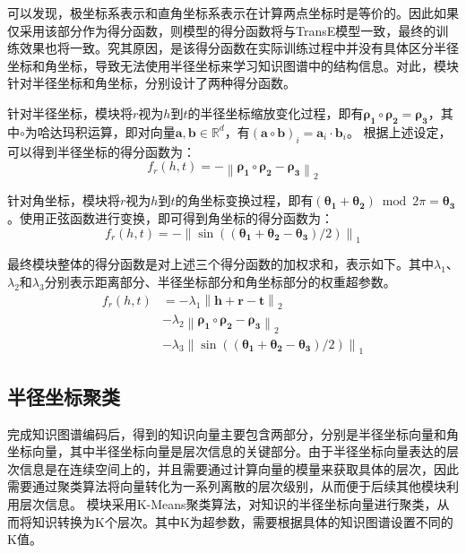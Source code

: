\documentclass[algorithmlist, AutoFakeBold, AutoFakeSlant, figurelist, tablelist, nomlist, masters]{seuthesix}
\begin{document}
可以发现，极坐标系表示和直角坐标系表示在计算两点坐标时是等价的。因此如果仅采用该部分作为得分函数，则模型的得分函数将与TransE模型一致，最终的训练效果也将一致。究其原因，是该得分函数在实际训练过程中并没有具体区分半径坐标和角坐标，导致无法使用半径坐标来学习知识图谱中的结构信息。对此，模块针对半径坐标和角坐标，分别设计了两种得分函数。

针对半径坐标，模块将$r$视为$h$到$t$的半径坐标缩放变化过程，即有$\bm{\rho_1} \circ \bm{\rho_2} = \bm{\rho_3}$，其中$\circ$为哈达玛积运算，即对向量$\bm{a}, \bm{b} \in \mathbb{R}^{d}$，有$\left(\mathbf{a} \circ \mathbf{b}\right)_i = \mathbf{a}_i \cdot \mathbf{b}_i$。
根据上述设定，可以得到半径坐标的得分函数为：
\begin{equation}
  f_r\left(h, t\right) =-\left\|\bm{\rho_1} \circ \bm{\rho_2} - \bm{\rho_3}\right\|_2
\end{equation}

针对角坐标，模块将$r$视为$h$到$t$的角坐标变换过程，即有$(\bm{\theta_1} + \bm{\theta_2}) \bmod 2 \pi = \bm{\theta_3}$。使用正弦函数进行变换，即可得到角坐标的得分函数为：
\begin{equation}
  f_r\left(h, t\right) =-\left\|\sin \left(\left(\bm{\theta_1}+\bm{\theta_2}-\bm{\theta_3}\right) / 2\right)\right\|_1
\end{equation}

最终模块整体的得分函数是对上述三个得分函数的加权求和，表示如下。其中$\lambda_1$、$\lambda_2$和$\lambda_3$分别表示距离部分、半径坐标部分和角坐标部分的权重超参数。
\begin{equation}
  \begin{aligned}
    f_r\left(h, t\right) &=-\lambda_1 \left\|\bm{h} + \bm{r} - \bm{t}\right\|_2 \\
    &-\lambda_2 \left\|\bm{\rho_1} \circ \bm{\rho_2} - \bm{\rho_3}\right\|_2 \\
    &-\lambda_3\left\|\sin \left(\left(\bm{\theta_1}+\bm{\theta_2}-\bm{\theta_3}\right) / 2\right)\right\|_1
  \end{aligned}
\end{equation}

\subsection{半径坐标聚类}
完成知识图谱编码后，得到的知识向量主要包含两部分，分别是半径坐标向量和角坐标向量，其中半径坐标向量是层次信息的关键部分。由于半径坐标向量表达的层次信息是在连续空间上的，并且需要通过计算向量的模量来获取具体的层次，因此需要通过聚类算法将向量转化为一系列离散的层次级别，从而便于后续其他模块利用层次信息。
模块采用K-Means聚类算法，对知识的半径坐标向量进行聚类，从而将知识转换为K个层次。其中K为超参数，需要根据具体的知识图谱设置不同的K值。
\end{document}
